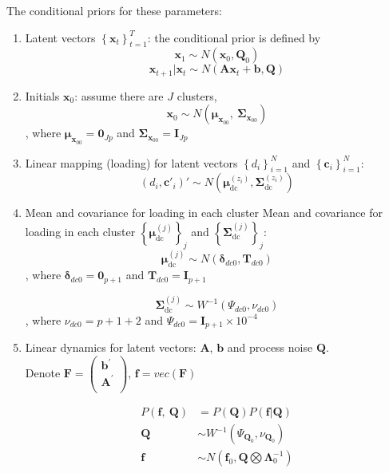 \documentclass[]{article}
\begin{document}
The conditional priors for these parameters:
\begin{enumerate}
	\def\labelenumi{(\arabic{enumi})}
	\item
	Latent vectors \(\left\{ \mathbf{x}_{t} \right\}_{t=1}^T\): the conditional prior is
	defined by
	\[\mathbf{x}_{1} \sim N(\mathbf{x}_{0},\mathbf{Q}_{0})\]
	\[\mathbf{x}_{t + 1}|\mathbf{x}_{t} \sim N(\mathbf{A}\mathbf{x}_{t} + \mathbf{b},\mathbf{Q})\]
	\item
	Initials \(\mathbf{x}_{0}\): assume there are \(J\) clusters,
	\[\mathbf{x}_{0} \sim N(\bm{\mu}_{\mathbf{x}_{00}},\ \mathbf{\Sigma}_{\mathbf{x}_{00}})\]
	, where \(\bm{\mu}_{\mathbf{x}_{00}} = \mathbf{0}_{Jp}\) and \(\mathbf{\Sigma}_{\mathbf{x}_{00}} = \mathbf{I}_{Jp}\)
	\item
	Linear mapping (loading) for latent vectors
	\(\left\{ d_{i} \right\}_{i = 1}^{N}\) and
	\(\left\{ \mathbf{c}_{i} \right\}_{i = 1}^{N}\):
	\[\left( d_{i},\mathbf{c}'_{i} \right)' \sim N(\bm{\mu}_{\text{dc}}^{\left( z_{i} \right)},\mathbf{\Sigma}_{\text{dc}}^{(z_{i})})\]
	\item
	Mean and covariance for loading in each cluster
	Mean and covariance for loading in each cluster
	\(\left\{ \bm{\mu}_{\text{dc}}^{(j)} \right\}_{j}\) and
	\(\left\{ \mathbf{\Sigma}_{\text{dc}}^{(j)} \right\}_{j}\):
	\[\bm{\mu}_{\text{dc}}^{(j)} \sim N(\mathbf{\delta}_{dc0},\mathbf{T}_{dc0})\]
	, where \(\bm{\delta}_{dc0} = \mathbf{0}_{p + 1}\) and
	\(\mathbf{T}_{dc0} = \mathbf{I}_{p + 1}\)
	
	\[\mathbf{\Sigma}_{\text{dc}}^{(j)} \sim W^{- 1}\left( \Psi_{dc0},\nu_{dc0} \right)\]
	, where \(\nu_{dc0} = p + 1 + 2\) and
	\(\Psi_{dc0} = \mathbf{I}_{p + 1} \times 10^{-4}\)
	
	\item
	Linear dynamics for latent vectors: \(\mathbf{A}\), \(\mathbf{b}\) and process noise \(\mathbf{Q}\).\\ 
	Denote \(\mathbf{F} = \begin{pmatrix}
		\mathbf{b}^{'} \\
		\mathbf{A}^{'} \\
	\end{pmatrix}\), \(\mathbf{f} = vec(\mathbf{F})\)
	
	\begin{align*}
		P\left( \mathbf{f},\ \mathbf{Q} \right) &= P(\mathbf{Q})P(\mathbf{f}|\mathbf{Q})\\
		\mathbf{Q} &\sim W^{- 1}(\Psi_{\mathbf{Q}_{0}},\nu_{\mathbf{Q}_{0}})\\
		\mathbf{f} &\sim N(\mathbf{f}_0, \mathbf{Q}\bigotimes \bm{\Lambda}_0^{-1})
	\end{align*}
	

\end{enumerate}
\end{document}
